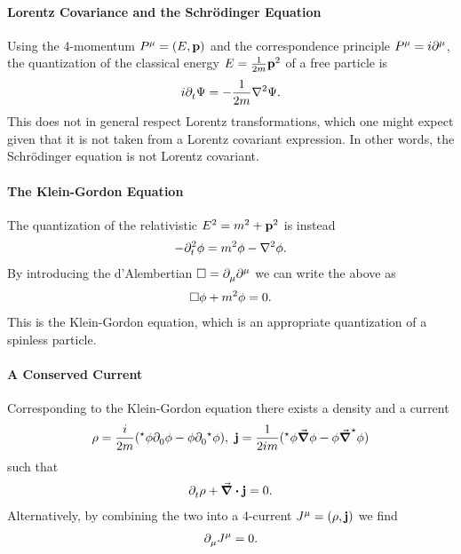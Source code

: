 \paragraph{Lorentz Covariance and the Schrödinger Equation}
Using the 4-momentum $P^{\mu} = (E, \vb{p})$ and the correspondence principle $P^{\mu} = i\partial^{\mu}_{}{}$, the quantization of the classical energy $E = \frac{1}{2m}\vb{p}^{2}$ of a free particle is
\begin{align*}
	i\del{}{t}{\Psi} = -\frac{1}{2m}\laplacian{\Psi}.
\end{align*}
This does not in general respect Lorentz transformations, which one might expect given that it is not taken from a Lorentz covariant expression. In other words, the Schrödinger equation is not Lorentz covariant.

\paragraph{The Klein-Gordon Equation}
The quantization of the relativistic $E^{2} = m^{2} + \vb{p}^{2}$ is instead
\begin{align*}
	-\del{2}{t}{\phi} = m^{2}\phi - \laplacian{\phi}.
\end{align*}
By introducing the d'Alembertian $\square{} = \partial^{}_{\mu}{\partial^{\mu}_{}{}}$ we can write the above as
\begin{align*}
	\square{\phi} + m^{2}\phi = 0.
\end{align*}
This is the Klein-Gordon equation, which is an appropriate quantization of a spinless particle.

\paragraph{A Conserved Current}
Corresponding to the Klein-Gordon equation there exists a density and a current
\begin{align*}
	\rho = \frac{i}{2m}(^{\star}{\phi}\partial^{}_{0}{\phi} - \phi\partial^{}_{0}{^{\star}{\phi}}),\ \vb{j} = \frac{1}{2im}(^{\star}{\phi}\grad{\phi} - \phi\grad{\ensuremath{^{\star}}{\phi}})
\end{align*}
such that
\begin{align*}
	\partial^{}_{t}{\rho} + \div{\vb{j}} = 0.
\end{align*}
Alternatively, by combining the two into a 4-current $J^{\mu} = (\rho, \vb{j})$ we find
\begin{align*}
	\partial^{}_{\mu}{J^{\mu}} = 0.
\end{align*}


